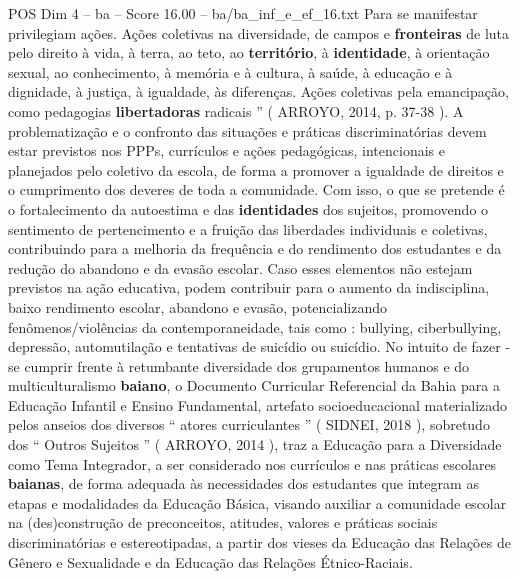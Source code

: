 \begin{textsample}{POS Dim 4 – ba – Score 16.00 – ba/ba\_inf\_e\_ef\_16.txt}
Para se manifestar privilegiam ações.
Ações coletivas na diversidade, de campos e \textbf{fronteiras} de luta pelo direito à vida, à terra, ao teto, ao \textbf{território}, à \textbf{identidade}, à orientação sexual, ao conhecimento, à memória e à cultura, à saúde, à educação e à dignidade, à justiça, à igualdade, às diferenças.
Ações coletivas pela emancipação, como pedagogias \textbf{libertadoras} radicais ” ( ARROYO, 2014, p. 37-38 ).
A problematização e o confronto das situações e práticas discriminatórias devem estar previstos nos PPPs, currículos e ações pedagógicas, intencionais e planejados pelo coletivo da escola, de forma a promover a igualdade de direitos e o cumprimento dos deveres de toda a comunidade.
Com isso, o que se pretende é o fortalecimento da autoestima e das \textbf{identidades} dos sujeitos, promovendo o sentimento de pertencimento e a fruição das liberdades individuais e coletivas, contribuindo para a melhoria da frequência e do rendimento dos estudantes e da redução do abandono e da evasão escolar.
Caso esses elementos não estejam previstos na ação educativa, podem contribuir para o aumento da indisciplina, baixo rendimento escolar, abandono e evasão, potencializando fenômenos/violências da contemporaneidade, tais como : bullying, ciberbullying, depressão, automutilação e tentativas de suicídio ou suicídio.
No intuito de fazer -se cumprir frente à retumbante diversidade dos grupamentos humanos e do multiculturalismo \textbf{baiano}, o Documento Curricular Referencial da Bahia para a Educação Infantil e Ensino Fundamental, artefato socioeducacional materializado pelos anseios dos diversos “ atores curriculantes ” ( SIDNEI, 2018 ), sobretudo dos “ Outros Sujeitos ” ( ARROYO, 2014 ), traz a Educação para a Diversidade como Tema Integrador, a ser considerado nos currículos e nas práticas escolares \textbf{baianas}, de forma adequada às necessidades dos estudantes que integram as etapas e modalidades da Educação Básica, visando auxiliar a comunidade escolar na (des)construção de preconceitos, atitudes, valores e práticas sociais discriminatórias e estereotipadas, a partir dos vieses da Educação das Relações de Gênero e Sexualidade e da Educação das Relações Étnico-Raciais.

\end{textsample}
